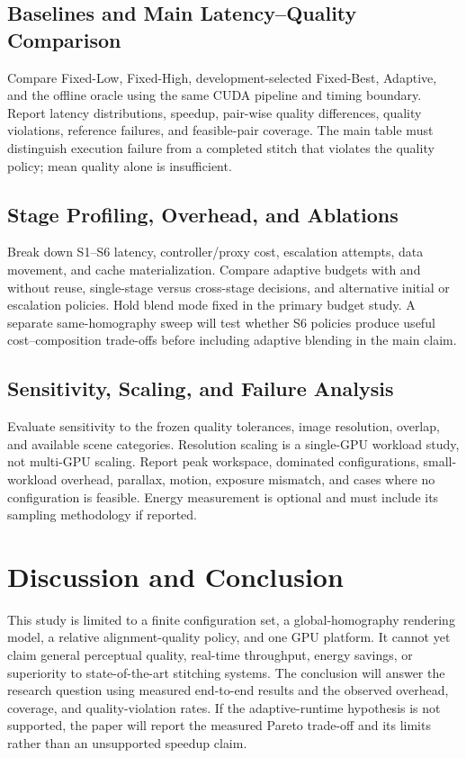 \documentclass[a4paper,UKenglish,cleveref,autoref,anonymous]{oasics-v2021}
\begin{document}
\subsection{Baselines and Main Latency--Quality Comparison}
Compare Fixed-Low, Fixed-High, development-selected Fixed-Best, Adaptive, and
the offline oracle using the same CUDA pipeline and timing boundary. Report
latency distributions, speedup, pair-wise quality differences, quality violations,
reference failures, and feasible-pair coverage. The main table must distinguish
execution failure from a completed stitch that violates the quality policy;
mean quality alone is insufficient.

\subsection{Stage Profiling, Overhead, and Ablations}
Break down S1--S6 latency, controller/proxy cost, escalation attempts, data
movement, and cache materialization. Compare adaptive budgets with and without
reuse, single-stage versus cross-stage decisions, and alternative initial or
escalation policies. Hold blend mode fixed in the primary budget study.
A separate same-homography sweep will test whether S6 policies produce useful
cost--composition trade-offs before including adaptive blending in the main claim.

\subsection{Sensitivity, Scaling, and Failure Analysis}
Evaluate sensitivity to the frozen quality tolerances, image resolution, overlap,
and available scene categories. Resolution scaling is a single-GPU workload
study, not multi-GPU scaling. Report peak workspace, dominated configurations,
small-workload overhead, parallax, motion, exposure mismatch, and cases where
no configuration is feasible. Energy measurement is optional and must include
its sampling methodology if reported.

\section{Discussion and Conclusion}
\label{sec:conclusion}
This study is limited to a finite configuration set, a global-homography
rendering model, a relative alignment-quality policy, and one GPU platform.
It cannot yet claim general perceptual quality, real-time throughput, energy
savings, or superiority to state-of-the-art stitching systems. The conclusion
will answer the research question using measured end-to-end results and the
observed overhead, coverage, and quality-violation rates. If the adaptive-runtime
hypothesis is not supported, the paper will report the measured Pareto trade-off
and its limits rather than an unsupported speedup claim.


\end{document}
